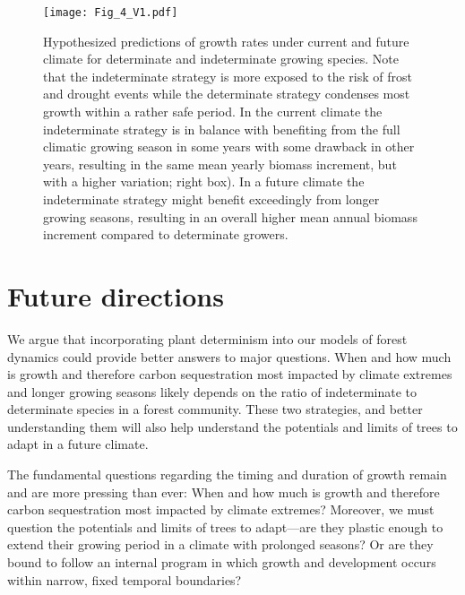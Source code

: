 \documentclass{article}
\begin{document}
								\begin{figure}
								\centering
								\texttt{[image: Fig\_4\_V1.pdf]} 
								\caption{Hypothesized predictions of growth rates under current and future climate for determinate and indeterminate growing species. Note that the indeterminate strategy is more exposed to the risk of frost and drought events while the determinate strategy condenses most growth within a rather safe period. In the current climate the indeterminate strategy is in balance with benefiting from the full climatic growing season in some years with some drawback in other years, resulting in the same mean yearly biomass increment, but with a higher variation; right box). In a future climate the indeterminate strategy might benefit exceedingly from longer growing seasons, resulting in an overall higher mean annual biomass increment compared to determinate growers.}
								\label{fig:fig_4xxx}
							\end{figure}
	\pagebreak
\section*{Future directions}

We argue that incorporating plant determinism into our models of forest dynamics could provide better answers to major questions. When and how much is growth and therefore carbon sequestration most impacted by climate extremes and longer growing seasons likely depends on the ratio of indeterminate to determinate species in a forest community. These two strategies, and better understanding them will also help understand the potentials and limits of trees to adapt in a future climate.

The fundamental questions regarding the timing and duration of growth remain and are more pressing than ever: When and how much is growth and therefore carbon sequestration most impacted by climate extremes? Moreover, we must question the potentials and limits of trees to adapt---are they plastic enough to extend their growing period in a climate with prolonged seasons? Or are they bound to follow an internal program in which growth and development occurs within narrow, fixed temporal boundaries? 
\end{document}
